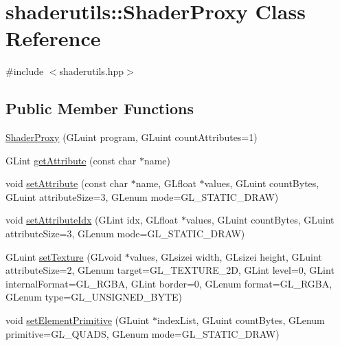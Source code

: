 \hypertarget{classshaderutils_1_1_shader_proxy}{}\section{shaderutils\+:\+:Shader\+Proxy Class Reference}
\label{classshaderutils_1_1_shader_proxy}


{\ttfamily \#include $<$shaderutils.\+hpp$>$}

\subsection*{Public Member Functions}
\begin{DoxyCompactItemize}
\item 
\mbox{\hyperlink{classshaderutils_1_1_shader_proxy_aeb8e71b91f4b2871dadc9152ead5d05a}{Shader\+Proxy}} (G\+Luint program, G\+Luint count\+Attributes=1)
\item 
G\+Lint \mbox{\hyperlink{classshaderutils_1_1_shader_proxy_aa30751bc64ecc5da76d66a17a2a10ecd}{get\+Attribute}} (const char $\ast$name)
\item 
void \mbox{\hyperlink{classshaderutils_1_1_shader_proxy_aa870e4941cb9549f17850b82fc5c93b7}{set\+Attribute}} (const char $\ast$name, G\+Lfloat $\ast$values, G\+Luint count\+Bytes, G\+Luint attribute\+Size=3, G\+Lenum mode=G\+L\+\_\+\+S\+T\+A\+T\+I\+C\+\_\+\+D\+R\+AW)
\item 
void \mbox{\hyperlink{classshaderutils_1_1_shader_proxy_a181d172d7378c3060bc5cd56051c8a66}{set\+Attribute\+Idx}} (G\+Lint idx, G\+Lfloat $\ast$values, G\+Luint count\+Bytes, G\+Luint attribute\+Size=3, G\+Lenum mode=G\+L\+\_\+\+S\+T\+A\+T\+I\+C\+\_\+\+D\+R\+AW)
\item 
G\+Luint \mbox{\hyperlink{classshaderutils_1_1_shader_proxy_aad02ef9c140f8a656c3594b48b414386}{set\+Texture}} (G\+Lvoid $\ast$values, G\+Lsizei width, G\+Lsizei height, G\+Luint attribute\+Size=2, G\+Lenum target=G\+L\+\_\+\+T\+E\+X\+T\+U\+R\+E\+\_\+2D, G\+Lint level=0, G\+Lint internal\+Format=G\+L\+\_\+\+R\+G\+BA, G\+Lint border=0, G\+Lenum format=G\+L\+\_\+\+R\+G\+BA, G\+Lenum type=G\+L\+\_\+\+U\+N\+S\+I\+G\+N\+E\+D\+\_\+\+B\+Y\+TE)
\item 
void \mbox{\hyperlink{classshaderutils_1_1_shader_proxy_aa64c5b908d59fd145686f9e85eccca9f}{set\+Element\+Primitive}} (G\+Luint $\ast$index\+List, G\+Luint count\+Bytes, G\+Lenum primitive=G\+L\+\_\+\+Q\+U\+A\+DS, G\+Lenum mode=G\+L\+\_\+\+S\+T\+A\+T\+I\+C\+\_\+\+D\+R\+AW)
\item 

\end{DoxyCompactItemize}
